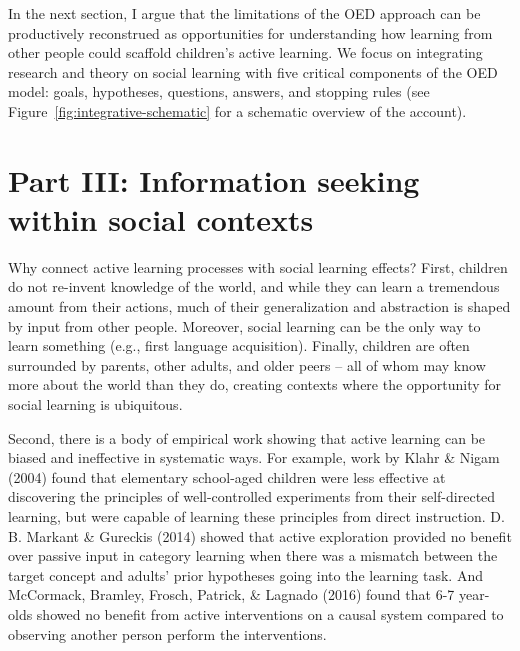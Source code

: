 \documentclass[oneside]{report}
\begin{document}
In the next section, I argue that the limitations of the OED approach
can be productively reconstrued as opportunities for understanding how
learning from other people could scaffold children's active learning. We
focus on integrating research and theory on social learning with five
critical components of the OED model: goals, hypotheses, questions,
answers, and stopping rules (see Figure~\ref{fig:integrative-schematic}
for a schematic overview of the account).

\hypertarget{active_social}{\section{Part III: Information seeking
within social contexts}\label{active_social}}

Why connect active learning processes with social learning effects?
First, children do not re-invent knowledge of the world, and while they
can learn a tremendous amount from their actions, much of their
generalization and abstraction is shaped by input from other people.
Moreover, social learning can be the only way to learn something (e.g.,
first language acquisition). Finally, children are often surrounded by
parents, other adults, and older peers -- all of whom may know more
about the world than they do, creating contexts where the opportunity
for social learning is ubiquitous.

Second, there is a body of empirical work showing that active learning
can be biased and ineffective in systematic ways. For example, work by
Klahr \& Nigam (2004) found that elementary school-aged children were
less effective at discovering the principles of well-controlled
experiments from their self-directed learning, but were capable of
learning these principles from direct instruction. D. B. Markant \&
Gureckis (2014) showed that active exploration provided no benefit over
passive input in category learning when there was a mismatch between the
target concept and adults' prior hypotheses going into the learning
task. And McCormack, Bramley, Frosch, Patrick, \& Lagnado (2016) found
that 6-7 year-olds showed no benefit from active interventions on a
causal system compared to observing another person perform the
interventions.
\end{document}
